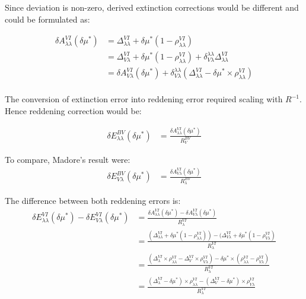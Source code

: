 \documentclass[12pt,a4paper]{article}
\begin{document}
Since deviation is non-zero, derived extinction corrections would be different and could be formulated as:

\begin{align*}
    \delta A_{\lambda \lambda}^{VI} (\delta \mu^*) &= \Delta_{\lambda \lambda}^{VI} + \delta \mu^*( 1 - \rho_{\lambda \lambda}^{VI} ) \\
    & =  \Delta_{V \lambda}^{VI} + \delta \mu^*( 1 - \rho_{\lambda \lambda}^{VI} ) + \delta_{V \lambda}^{\lambda \lambda} \Delta_{\lambda \lambda}^{VI} \\
    & =  \delta A_{V \lambda}^{VI}(\delta \mu^*) + \delta_{V \lambda}^{\lambda \lambda} (\Delta_{\lambda \lambda}^{VI} - \delta \mu^* \times  \rho_{\lambda \lambda}^{VI})\\
\end{align*}

The conversion of extinction error into reddening error required scaling with $R^{-1}$. 
Hence reddening correction would be: 

\begin{align*}
    \delta E_{\lambda \lambda}^{BV}(\delta \mu^*)  & = \frac{\delta A_{\lambda \lambda}^{VI}(\delta \mu^*)}{R^{BV}_V}  
\end{align*}
 
To compare, Madore's result were:  
\begin{align*}
    \delta E_{V \lambda}^{BV}(\delta \mu^*) & = \frac{\delta A_{V \lambda}^{VI}(\delta \mu^*)}{R^{BV}_\lambda} 
\end{align*}

The difference between both reddening errors is: 
\begin{align*}
    \delta E_{\lambda \lambda}^{VI}(\delta \mu^*) -  \delta E_{V \lambda}^{VI}(\delta \mu^*) & = \frac{\delta A_{\lambda \lambda}^{VI}(\delta \mu^*) - \delta A_{V \lambda}^{VI}(\delta \mu^*)}{R^{VI}_\lambda} \\
    & = \frac{(\Delta_{\lambda \lambda}^{VI} + \delta \mu^*  (1-\rho_{\lambda \lambda}^{VI}))- (\Delta_{V \lambda}^{VI} + \delta \mu^* (1- \rho_{V \lambda}^{VI})}{R^{VI}_\lambda} \\
    & = \frac{( \Delta_\lambda^{VI}  \times \rho_{\lambda \lambda}^{VI} - \Delta_V^{VI} \times \rho_{V \lambda}^{VI}) - \delta \mu^* \times ( \rho_{\lambda \lambda}^{VI} - \rho_{V \lambda}^{VI})}{R^{VI}_\lambda} \\
    & = \frac{ (\Delta_\lambda^{VI}  - \delta \mu^* )\times  \rho_{\lambda \lambda}^{VI}  - (\Delta_V^{VI}  - \delta \mu^* )\times \rho_{V \lambda}^{VI} }{R^{VI}_\lambda} \\
\end{align*}
\end{document}
